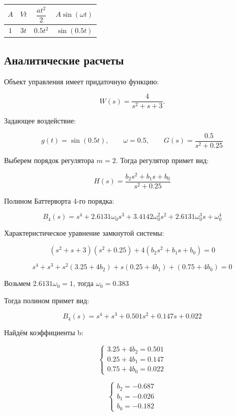 \documentclass[a5paper, 10pt]{article}
\renewcommand{\arraystretch}{2} %
\theoremstyle{definition}
\theoremstyle{plain}
\theoremstyle{remark}
\begin{document}
\begin{table}[H]
    \centering
    \renewcommand{\arraystretch}{2} %
    \begin{tabular}{|c|c|c|c|}
    \hline
        $A$ & $Vt$ & $\dfrac{at^2}{2}$ & $A\sin(\omega t)$ \\[3pt] \hline
        $1$ & $3t$ & $0.5t^2$ & $\sin(0.5t)$ \\ \hline
    \end{tabular}
    \label{tab:placeholder}
\end{table}

\subsection{Аналитические расчеты}

Объект управления имеет придаточную функцию:

$$
W(s)=\dfrac{4}{s^2+s+3}.
$$

Задающее воздействие:

$$
g(t)=\sin(0.5t), \qquad \omega=0.5, \qquad G(s)=\dfrac{0.5}{s^2+0.25}
$$

Выберем порядок регулятора $m = 2$. Тогда регулятор примет вид:

$$
H(s)=\dfrac{b_2 s^2 + b_1 s + b_0}{s^2+0.25}
$$

Полином Баттерворта 4-го порядка:

$$
B_4(s)=s^4+2.6131\omega_0s^3+3.4142\omega_0^2s^2+2.6131\omega_0^3s+\omega_0^4
$$

Характеристическое уравнение замкнутой системы:

$$
(s^2+s+3)(s^2+0.25)+4(b_2 s^2 + b_1 s + b_0)=0
$$

$$
s^4+s^3+s^2(3.25+4b_2)+s(0.25+4b_1)+(0.75+4b_0)=0
$$

Возьмем $2.6131\omega_0=1$, тогда $\omega_0=0.383$

Тогда полином примет вид:

$$
B_4(s)=s^4+s^3+0.501s^2+0.147s+0.022
$$

Найдём коэффициенты b:

$$
\begin{cases}
    3.25+4b_2=0.501\\
    0.25+4b_1=0.147\\
    0.75+4b_0=0.022
\end{cases}
$$

$$
\begin{cases}
    b_2=-0.687\\
    b_1=-0.026\\
    b_0=-0.182
\end{cases}
$$
\end{document}
